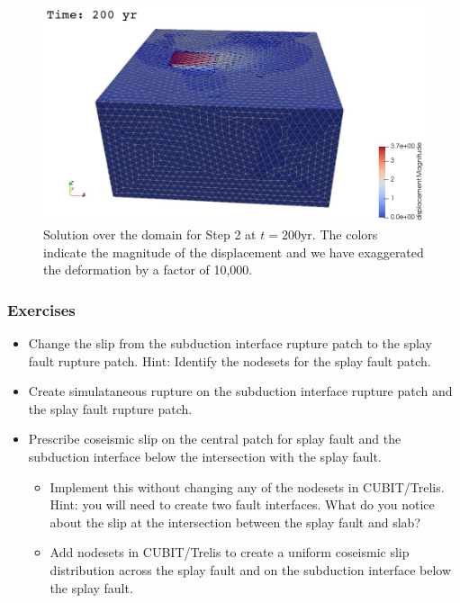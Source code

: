 \begin{figure}
  \includegraphics[width=5.0in]{examples/figs/subduction3d_step02_soln}
  \caption{Solution over the domain for Step 2 at $t = 200 \mathrm{yr}$. The
    colors indicate the magnitude of the displacement and we have
    exaggerated the deformation by a factor of 10,000.}
  \label{fig:example:subduction:3d:step02}
\end{figure}


\subsubsection{Exercises}

\begin{itemize}
\item Change the slip from the subduction interface rupture patch to
  the splay fault rupture patch. Hint: Identify the nodesets for the
  splay fault patch.
\item Create simulataneous rupture on the subduction interface rupture
  patch and the splay fault rupture patch.
\item Prescribe coseismic slip on the central patch for splay fault
  and the subduction interface below the intersection with the splay fault.
  \begin{itemize}
  \item Implement this without changing any of the nodesets in
    CUBIT/Trelis. Hint: you will need to create two fault
    interfaces. What do you notice about the slip at the intersection
    between the splay fault and slab?
  \item Add nodesets in CUBIT/Trelis to create a uniform coseismic
    slip distribution across the splay fault and on the subduction interface
    below the splay fault.
  \end{itemize}
\end{itemize}


